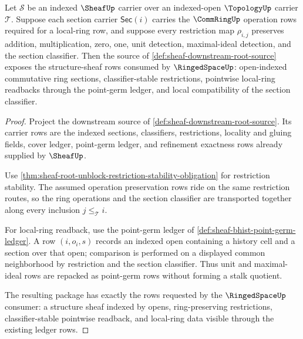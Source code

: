 \begin{theorem}
\label{thm:sheaf-ringedspace-local-ring-row}
Let $\mathcal{S}$ be an indexed $\SheafUp$ carrier over an indexed-open $\TopologyUp$ carrier $\mathcal{T}$. Suppose each section carrier $\mathsf{Sec}(i)$ carries the $\CommRingUp$ operation rows required for a local-ring row, and suppose every restriction map $\rho_{i,j}$ preserves addition, multiplication, zero, one, unit detection, maximal-ideal detection, and the section classifier. Then the source of \autoref{def:sheaf-downstream-root-source} exposes the structure-sheaf rows consumed by $\RingedSpaceUp$: open-indexed commutative ring sections, classifier-stable restrictions, pointwise local-ring readbacks through the point-germ ledger, and local compatibility of the section classifier.
\end{theorem}
\begin{proof}
Project the downstream source of \autoref{def:sheaf-downstream-root-source}. Its carrier rows are the indexed sections, classifiers, restrictions, locality and gluing fields, cover ledger, point-germ ledger, and refinement exactness rows already supplied by $\SheafUp$.

Use \autoref{thm:sheaf-root-unblock-restriction-stability-obligation} for restriction stability. The assumed operation preservation rows ride on the same restriction routes, so the ring operations and the section classifier are transported together along every inclusion $j\le_{\mathcal{T}}i$.

For local-ring readback, use the point-germ ledger of \autoref{def:sheaf-bhist-point-germ-ledger}. A row $(i,o_i,s)$ records an indexed open containing a history cell and a section over that open; comparison is performed on a displayed common neighborhood by restriction and the section classifier. Thus unit and maximal-ideal rows are repacked as point-germ rows without forming a stalk quotient.

The resulting package has exactly the rows requested by the $\RingedSpaceUp$ consumer: a structure sheaf indexed by opens, ring-preserving restrictions, classifier-stable pointwise readback, and local-ring data visible through the existing ledger rows.
\end{proof}

